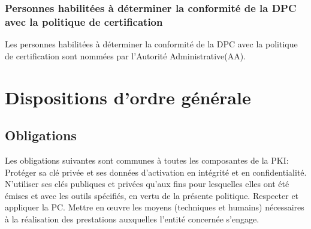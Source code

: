 \documentclass[a4paper,11pt,french]{article}
\begin{document}
\subsubsection{Personnes habilitées à déterminer la conformité de la DPC avec la politique de certification}

Les personnes habilitées à déterminer la conformité de la DPC avec la politique de certification sont nommées par l’Autorité Administrative(AA).

\section{Dispositions d'ordre générale}
\subsection{Obligations}
Les obligations suivantes sont communes à toutes les composantes de la PKI:
Protéger sa clé privée et ses données d’activation en intégrité et en confidentialité.
N’utiliser ses clés publiques et privées qu’aux fins pour lesquelles elles ont été émises et avec les outils spécifiés, en vertu de la présente politique.
Respecter et appliquer la PC.
Mettre en œuvre les moyens (techniques et humains) nécessaires à la réalisation des prestations auxquelles l’entité concernée s’engage.
\end{document}
